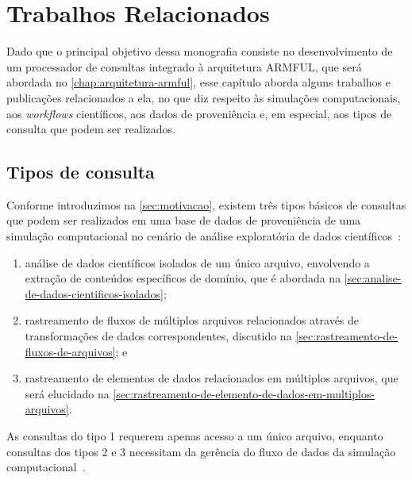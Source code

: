 
\chapter{Trabalhos Relacionados}%
\label{chap:trabalhos-relacionados}

Dado que o principal objetivo dessa monografia consiste no desenvolvimento de um processador de consultas integrado à arquitetura ARMFUL, que será abordada no \autoref{chap:arquitetura-armful}, esse capítulo aborda alguns trabalhos e publicações relacionados a ela, no que diz respeito às simulações computacionais, aos \textit{workflows} científicos, aos dados de proveniência e, em especial, aos tipos de consulta que podem ser realizados.

\section{Tipos de consulta}%
\label{sec:tipos-de-consulta}

Conforme introduzimos na \autoref{sec:motivacao}, existem três tipos básicos de consultas que podem ser realizados em uma base de dados de proveniência de uma simulação computacional no cenário de análise exploratória de dados científicos~\cite{silva2015analyzing,silva2015propostadoutorado}:

\begin{enumerate}
    \item análise de dados científicos isolados de um único arquivo, envolvendo a extração de conteúdos específicos de domínio, que é abordada na \autoref{sec:analise-de-dados-cientificos-isolados};
    \item rastreamento de fluxos de múltiplos arquivos relacionados através de transformações de dados correspondentes, discutido na \autoref{sec:rastreamento-de-fluxos-de-arquivos}; e
    \item rastreamento de elementos de dados relacionados em múltiplos arquivos, que será elucidado na \autoref{sec:rastreamento-de-elemento-de-dados-em-multiplos-arquivos}.
\end{enumerate}

As consultas do tipo 1 requerem apenas acesso a um único arquivo, enquanto consultas dos tipos 2 e 3 necessitam da gerência do fluxo de dados da simulação computacional~\cite{silva2015analyzing}.


